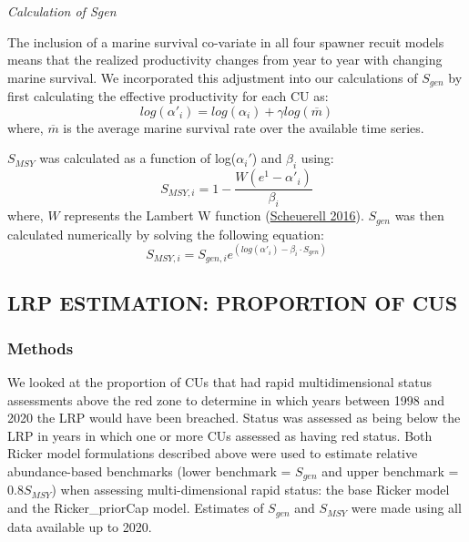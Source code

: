 \documentclass[11pt]{book}
\begin{document}
\emph{Calculation of Sgen}

The inclusion of a marine survival co-variate in all four spawner recuit models means that the realized productivity changes from year to year with changing marine survival. We incorporated this adjustment into our calculations of \(S_{gen}\) by first calculating the effective productivity for each CU as:
\begin{equation}
  log(\alpha'_{i}) = log(\alpha_i) + \gamma log(\overline{m})
   \label{eq:adjProd}
\end{equation}
where, \(\overline{m}\) is the average marine survival rate over the available time series.

\(S_{MSY}\) was calculated as a function of log(\(\alpha_i'\)) and \(\beta_i\) using:
\begin{equation}
  S_{MSY,i} = 1 - \frac{W(e^1-\alpha'_i)}{\beta_i} 
   \label{eq:Smsy}
\end{equation}
where, \(W\) represents the Lambert W function (\protect\hyperlink{ref-scheuerellExplicitSolutionCalculating2016}{Scheuerell 2016}). \(S_{gen}\) was then calculated numerically by solving the following equation:
\begin{equation}
  S_{MSY,i} = S_{gen,i}e^(log(\alpha'_{i})- \beta_i \cdot S_{gen})
  \label{eq:Sgen}
\end{equation}
\hypertarget{lrp-estimation-proportion-of-cus}{%
\subsection{LRP ESTIMATION: PROPORTION OF CUS}\label{lrp-estimation-proportion-of-cus}}

\hypertarget{methods}{%
\subsubsection{Methods}\label{methods}}

We looked at the proportion of CUs that had rapid multidimensional status assessments above the red zone to determine in which years between 1998 and 2020 the LRP would have been breached. Status was assessed as being below the LRP in years in which one or more CUs assessed as having red status. Both Ricker model formulations described above were used to estimate relative abundance-based benchmarks (lower benchmark = \(S_{gen}\) and upper benchmark = 0.8\(S_{MSY}\)) when assessing multi-dimensional rapid status: the base Ricker model and the Ricker\_priorCap model. Estimates of \(S_{gen}\) and \(S_{MSY}\) were made using all data available up to 2020.
\end{document}
